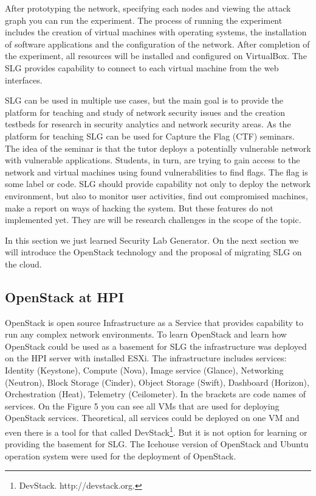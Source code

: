 After prototyping the network, specifying each nodes and viewing the attack graph you can run the experiment. The process of running the experiment includes the creation of virtual machines with operating systems, the installation of software applications and the configuration of the network. After completion of the experiment, all resources will be installed and configured on VirtualBox. The SLG provides capability to connect to each virtual machine from the web interfaces. 


SLG can be used in multiple use cases, but the main goal is to provide the platform for teaching and study of network security issues and the creation testbeds for research in security analytics and network security areas. 
As the platform for teaching SLG can be used for Capture the Flag (CTF) seminars. The idea of the seminar is that the tutor deploys a potentially vulnerable network with vulnerable applications. Students, in turn, are trying to gain access to the network and virtual machines using found vulnerabilities to find flags. The flag is some label or code. SLG should provide capability not only to deploy the network environment, but also to monitor user activities, find out compromised machines, make a report on ways of hacking the system. But these features do not implemented yet.  They are will be research challenges in the scope of the topic.
  
  
In this section we just learned Security Lab Generator. On the next section we will introduce the OpenStack technology and the proposal of migrating SLG on the cloud.


 




\subsection{OpenStack at HPI}
OpenStack is open source Infrastructure as a Service that provides capability to run any complex network environments. To learn OpenStack and learn how OpenStack could be used as a basement for SLG the infrastructure was deployed on the HPI server with installed ESXi. The infrastructure includes services: Identity (Keystone), Compute (Nova), Image service (Glance), Networking (Neutron), Block Storage (Cinder), Object Storage (Swift), Dashboard (Horizon), Orchestration (Heat), Telemetry (Ceilometer). In the brackets are code names of services. On the Figure 5 you can see all VMs that are used for deploying OpenStack services. Theoretical, all services could be deployed on one VM and even there is a tool for that called DevStack\footnote{DevStack. http://devstack.org.}. But it is not option for learning or providing the basement for SLG. The Icehouse version of OpenStack and Ubuntu operation system were used for the deployment of OpenStack.  

